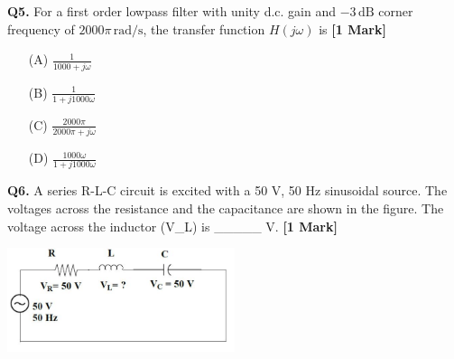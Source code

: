 \documentclass[11pt]{article}
\newcommand{\questiona}[2]{
    \noindent\textbf{Q#2.} #1 \hfill \textbf{[1 Mark]}
}
\begin{document}
\questiona{For a first order lowpass filter with unity d.c. gain and \(-3 \, \text{dB}\) corner frequency of \(2000\pi \, \text{rad/s}\), the transfer function \(H(j\omega)\) is}{5}
\begin{enumerate}
    \item[(A)] \(\frac{1}{1000 + j\omega}\)  
    \item[(B)] \(\frac{1}{1 + j1000\omega}\)  
    \item[(C)] \(\frac{2000\pi}{2000\pi + j\omega}\)  
    \item[(D)] \(\frac{1000\omega}{1 + j1000\omega}\)
\end{enumerate}
\vspace{0.5cm}

\questiona{A series R-L-C circuit is excited with a 50 V, 50 Hz sinusoidal source. The voltages across the resistance and the capacitance are shown in the figure. The voltage across the inductor (V_L) is \_\_\_\_\_ V.}{6}
\begin{center}
\includegraphics[width=0.5\textwidth]{figures/6.png}
\end{center}
\vspace{0.5cm}
\end{document}
